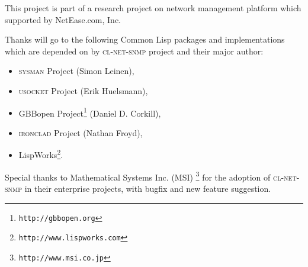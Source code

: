 \documentclass[reprint,9pt]{sigplanconf}
\begin{document}
\acks

This project is part of a research project on network management platform
which supported by NetEase.com, Inc.

Thanks will go to the following Common Lisp packages and
implementations which are depended on by \textsc{cl-net-snmp} project
and their major author:
%
\begin{itemize}
\item \textsc{sysman} Project (Simon Leinen),
\item \textsc{usocket} Project (Erik Huelsmann),
\item GBBopen Project\footnote{\texttt{http://gbbopen.org}} (Daniel D. Corkill),
\item \textsc{ironclad} Project (Nathan Froyd),
\item LispWorks\footnote{\texttt{http://www.lispworks.com}}.
\end{itemize}

Special thanks to Mathematical Systems Inc. (MSI) \footnote{
\texttt{http://www.msi.co.jp}} for the adoption of
\textsc{cl-net-snmp} in their enterprise projects,
with bugfix and new feature suggestion.


\end{document}
